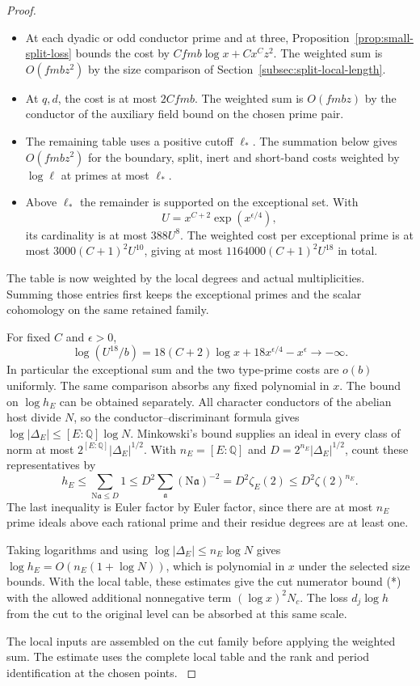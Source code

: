 \begin{proof}
\begin{itemize}
\item At each dyadic or odd conductor prime and at three,
Proposition~\ref{prop:small-split-loss} bounds the cost by \(C fmb\log x+Cx^Cz^2\). The weighted
sum is \(O(fmbz^2)\) by the size comparison of
Section~\ref{subsec:split-local-length}.
\item At \(q,d\), the cost is at most \(2C fmb\).
The weighted sum is \(O(fmbz)\) by the conductor of the auxiliary field
bound on the chosen prime pair.
\item The remaining table uses a positive cutoff
\(\ell_*\). The summation below gives \(O(fmbz^2)\)
for the boundary, split, inert and short-band costs
weighted by \(\log\ell\) at primes at most \(\ell_*\).
\item Above \(\ell_*\) the remainder is supported on
the exceptional set. With
\[
 U=x^{C+2}\exp(x^{\epsilon/4}),
\]
its cardinality is at most \(388U^8\). The weighted cost
per exceptional prime is at most \(3000(C+1)^2U^{10}\),
giving at most \(1164000(C+1)^2U^{18}\) in total.
\end{itemize}

The table is now weighted by the local degrees and actual multiplicities. Summing those entries first keeps the exceptional primes and the scalar cohomology on the same retained family.

For fixed \(C\) and \(\epsilon>0\),
\[
 \log(U^{18}/b)=18(C+2)\log x+18x^{\epsilon/4}-x^\epsilon
 \longrightarrow -\infty .
\]
In particular the exceptional sum and the two type-prime
costs are \(o(b)\) uniformly. The same comparison absorbs
any fixed polynomial in \(x\). The bound on \(\log h_E\)
can be obtained separately. All character conductors of the abelian
host divide \(N\), so the conductor--discriminant formula
gives \(\log|\Delta_E|\le [E:\mathbb Q]\log N\).
Minkowski's bound supplies an ideal in every class of
norm at most \(2^{[E:\mathbb Q]}|\Delta_E|^{1/2}\).
\cite[Theorems 3.27 and 4.3 respectively]{milne-cft,milne-ant}
With \(n_E=[E:\mathbb Q]\) and
\(D=2^{n_E}|\Delta_E|^{1/2}\), count these representatives by
\[
 h_E\le\sum_{\mathrm N\mathfrak a\le D}1
  \le D^2\sum_{\mathfrak a}(\mathrm N\mathfrak a)^{-2}
  =D^2\zeta_E(2)\le D^2\zeta(2)^{n_E}.
\]
The last inequality is Euler factor by Euler factor, since there
are at most \(n_E\) prime ideals above each rational prime and
their residue degrees are at least one.

Taking logarithms and
using \(\log|\Delta_E|\le n_E\log N\) gives
\(\log h_E=O(n_E(1+\log N))\), which is polynomial in \(x\)
under the selected size bounds. With the local table,
these estimates give the cut numerator bound (*) with the
allowed additional
nonnegative term \((\log x)^2 N_c\). The loss \(d_j\log h\)
from the cut to the original level can be absorbed
at this same scale.

The local inputs are assembled on the cut family
before applying the weighted sum. The estimate uses
the complete local table and the rank and period
identification at the chosen points. \label{cor:numerator-sums-1}
\end{proof}


